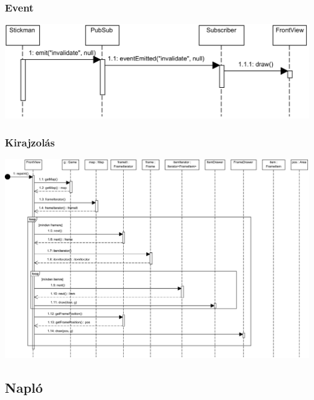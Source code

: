 		\subsubsection{Event}
		    \begin{center}
			    \includegraphics[scale=0.88]{resources/event.png}
		    \end{center}

		\subsubsection{Kirajzolás}
		    \begin{center}
			    \includegraphics[scale=0.70, angle=-90]{resources/drawing.png}
		    \end{center}
	
		\subsection{Napló}
	

